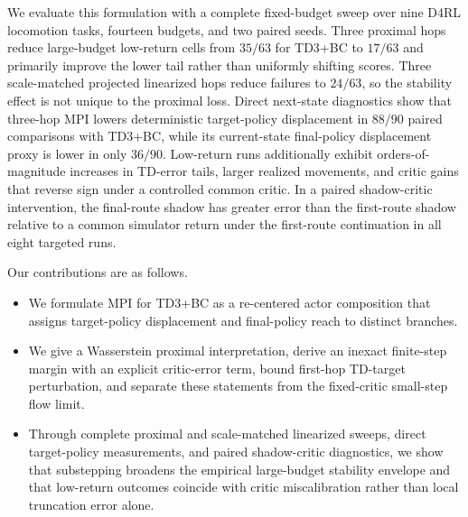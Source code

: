 We evaluate this formulation with a complete fixed-budget sweep over nine D4RL locomotion tasks, fourteen budgets, and two paired seeds. Three proximal hops reduce large-budget low-return cells from $35/63$ for TD3+BC to $17/63$ and primarily improve the lower tail rather than uniformly shifting scores. Three scale-matched projected linearized hops reduce failures to $24/63$, so the stability effect is not unique to the proximal loss. Direct next-state diagnostics show that three-hop MPI lowers deterministic target-policy displacement in $88/90$ paired comparisons with TD3+BC, while its current-state final-policy displacement proxy is lower in only $36/90$. Low-return runs additionally exhibit orders-of-magnitude increases in TD-error tails, larger realized movements, and critic gains that reverse sign under a controlled common critic. In a paired shadow-critic intervention, the final-route shadow has greater error than the first-route shadow relative to a common simulator return under the first-route continuation in all eight targeted runs.

Our contributions are as follows.
\begin{itemize}
    \item We formulate MPI for TD3+BC as a re-centered actor composition that assigns target-policy displacement and final-policy reach to distinct branches.
    \item We give a Wasserstein proximal interpretation, derive an inexact finite-step margin with an explicit critic-error term, bound first-hop TD-target perturbation, and separate these statements from the fixed-critic small-step flow limit.
    \item Through complete proximal and scale-matched linearized sweeps, direct target-policy measurements, and paired shadow-critic diagnostics, we show that substepping broadens the empirical large-budget stability envelope and that low-return outcomes coincide with critic miscalibration rather than local truncation error alone.
\end{itemize}
